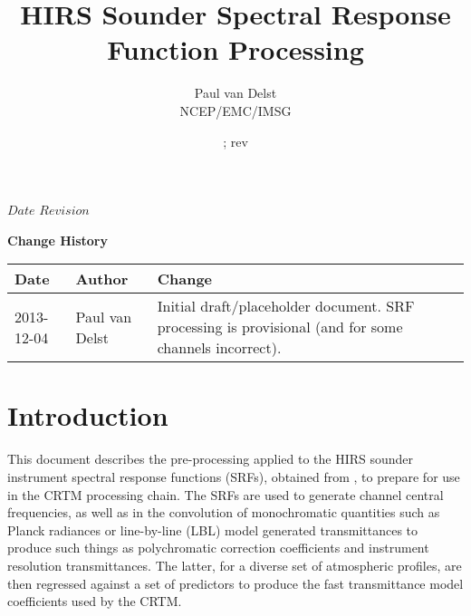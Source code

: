 



\SVN $Date$
\SVN $Revision$

\title{HIRS Sounder Spectral Response Function Processing}
\author{Paul van Delst\\NCEP/EMC/IMSG}
\date{\SVNDate ; rev\SVNRevision}



\maketitle

\draftwatermark

\thispagestyle{empty}
\vspace*{10cm}
\begin{center}
  {\sffamily\Large\bfseries Change History}
  \begin{table}[htp]
    \centering
    \begin{tabular}{|p{2cm}|p{3cm}|p{8cm}|}
      \hline
      \sffamily\textbf{Date} & \sffamily\textbf{Author} & \sffamily\textbf{Change}\\
      \hline\hline
      2013-12-04 & Paul van Delst & Initial draft/placeholder document. SRF processing is provisional (and for some channels incorrect).\\
      \hline
    \end{tabular}
  \end{table}
\end{center}
\clearpage
\pagestyle{fancy}
\fancyhead[LE,RO]{\sffamily \rightmark}
\fancyhead[LO,RE]{\sffamily \leftmark}
\setcounter{page}{1}



\section{Introduction}
This document describes the pre-processing applied to the HIRS sounder instrument spectral response functions (SRFs), obtained from \cite{HIRS_SRF_Data}, to prepare for use in the CRTM processing chain. The SRFs are used to generate channel central frequencies, as well as in the convolution of monochromatic quantities such as Planck radiances or line-by-line (LBL) model generated transmittances to produce such things as polychromatic correction coefficients and instrument resolution transmittances. The latter, for a diverse set of atmospheric profiles, are then regressed against a set of predictors to produce the fast transmittance model coefficients used by the CRTM.


